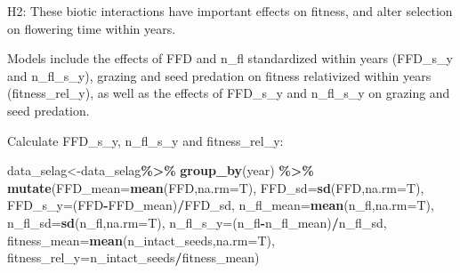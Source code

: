 \documentclass[
]{article}
\newenvironment{Shaded}{\begin{snugshade}}{\end{snugshade}}
\newcommand{\DataTypeTok}[1]{\textcolor[rgb]{0.13,0.29,0.53}{#1}}
\newcommand{\DecValTok}[1]{\textcolor[rgb]{0.00,0.00,0.81}{#1}}
\newcommand{\KeywordTok}[1]{\textcolor[rgb]{0.13,0.29,0.53}{\textbf{#1}}}
\newcommand{\NormalTok}[1]{#1}
\newcommand{\OperatorTok}[1]{\textcolor[rgb]{0.81,0.36,0.00}{\textbf{#1}}}
\newcommand{\OtherTok}[1]{\textcolor[rgb]{0.56,0.35,0.01}{#1}}
\newcommand{\StringTok}[1]{\textcolor[rgb]{0.31,0.60,0.02}{#1}}
\begin{document}
H2: These biotic interactions have important effects on fitness, and
alter selection on flowering time within years.

Models include the effects of FFD and n\_fl standardized within years
(FFD\_s\_y and n\_fl\_s\_y), grazing and seed predation on fitness
relativized within years (fitness\_rel\_y), as well as the effects of
FFD\_s\_y and n\_fl\_s\_y on grazing and seed predation.

Calculate FFD\_s\_y, n\_fl\_s\_y and fitness\_rel\_y:

\begin{Shaded}
\begin{Highlighting}[]
\NormalTok{data\_selag\textless{}{-}data\_selag}\OperatorTok{\%\textgreater{}\%}\StringTok{ }
\StringTok{  }\KeywordTok{group\_by}\NormalTok{(year) }\OperatorTok{\%\textgreater{}\%}\StringTok{ }
\StringTok{  }\KeywordTok{mutate}\NormalTok{(}\DataTypeTok{FFD\_mean=}\KeywordTok{mean}\NormalTok{(FFD,}\DataTypeTok{na.rm=}\NormalTok{T),}
         \DataTypeTok{FFD\_sd=}\KeywordTok{sd}\NormalTok{(FFD,}\DataTypeTok{na.rm=}\NormalTok{T),}
         \DataTypeTok{FFD\_s\_y=}\NormalTok{(FFD}\OperatorTok{{-}}\NormalTok{FFD\_mean)}\OperatorTok{/}\NormalTok{FFD\_sd,}
         \DataTypeTok{n\_fl\_mean=}\KeywordTok{mean}\NormalTok{(n\_fl,}\DataTypeTok{na.rm=}\NormalTok{T),}
         \DataTypeTok{n\_fl\_sd=}\KeywordTok{sd}\NormalTok{(n\_fl,}\DataTypeTok{na.rm=}\NormalTok{T),}
         \DataTypeTok{n\_fl\_s\_y=}\NormalTok{(n\_fl}\OperatorTok{{-}}\NormalTok{n\_fl\_mean)}\OperatorTok{/}\NormalTok{n\_fl\_sd,}
         \DataTypeTok{fitness\_mean=}\KeywordTok{mean}\NormalTok{(n\_intact\_seeds,}\DataTypeTok{na.rm=}\NormalTok{T),}
         \DataTypeTok{fitness\_rel\_y=}\NormalTok{n\_intact\_seeds}\OperatorTok{/}\NormalTok{fitness\_mean)}
\end{Highlighting}
\end{Shaded}

\begin{Shaded}
\end{Shaded}
\end{document}
